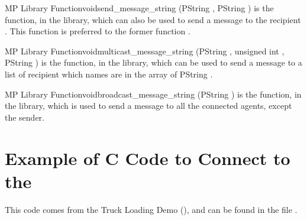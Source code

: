 \begin{typefn}{MP Library Function}{void}{send\_message\_string}
        {(PString , PString )}
is the function, in the  library, which can also be used to
send a message  to the recipient . This function
 is preferred to the former function
.
\end{typefn}

\begin{typefn}{MP Library Function}{void}{multicast\_message\_string}
        {(PString , unsigned int , PString )}
is the function, in the  library, which can be used to
send a message  to  a list of  recipient which names
are in the array of PString . 
\end{typefn}

\begin{typefn}{MP Library Function}{void}{broadcast\_message\_string}
        {(PString )}
is the function, in the  library, which is used to send a message
 to  all the connected agents, except the sender.  
\end{typefn}

\section{Example of C Code to Connect to the \MP{}}

This code comes from the Truck Loading Demo (), and
can be found in the file .

